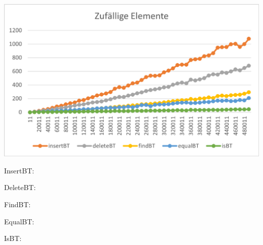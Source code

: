 \documentclass[11pt]{article}
\begin{document}
    \begin{center}
        \includegraphics[width=0.9\columnwidth] {ZeitAvg.pdf}
    \end{center}
    
    InsertBT:
    
    DeleteBT:
    
    FindBT:
    
    EqualBT:
    
    IsBT:
\end{document}
